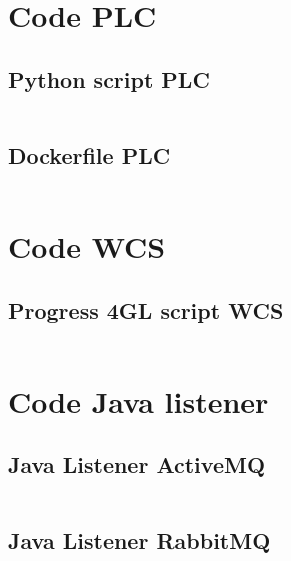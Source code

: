 
\section{Code PLC}\label{sec:code_plc}

\subsection{Python script PLC} \label{sec:script_plc}
\inputminted{python3}{../tests/plc/plc-simulator.py}
\newpage

\subsection{Dockerfile PLC} \label{sec:docker_plc}
\inputminted{python3}{../tests/plc/Dockerfile}

\section{Code WCS}\label{sec:code_wcs}

\subsection{Progress 4GL script WCS} \label{sec:script_wcs}
\inputminted{python3}{../tests/wcs/wcs.p}

\section{Code Java listener}\label{sec:code_java_listener} 

\subsection{Java Listener ActiveMQ}\label{sec:listener_activemq}
\inputminted{java}{../tests/listener/activemq-listener/demo/src/main/java/com/example/ActiveMQSocketBridge.java}


\subsection{Java Listener RabbitMQ}\label{sec:listener_rabbitmq}
\inputminted{java}{../tests/listener/rabbitmq-listener/rabbitmq-plc-listener/src/main/java/com/listener/RabbitMQSocketBridge.java}



